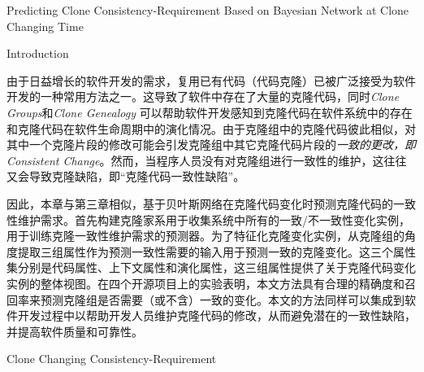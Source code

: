 
{Predicting Clone Consistency-Requirement Based on Bayesian Network at Clone Changing Time}

{Introduction}

由于日益增长的软件开发的需求，复用已有代码（代码克隆）已被广泛接受为软件开发的一种常用方法之一。这导致了软件中存在了大量的克隆代码，同时{\em Clone Groups}和{\em   Clone Genealogy }可以帮助软件开发感知到克隆代码在软件系统中的存在和克隆代码在软件生命周期中的演化情况。由于克隆组中的克隆代码彼此相似，对其中一个克隆片段的修改可能会引发克隆组中其它克隆代码片段的{\em 一致的更改，即Consistent Change}。然而，当程序人员没有对克隆组进行一致性的维护，这往往又会导致克隆缺陷，即“克隆代码一致性缺陷”。%

因此，本章与第三章相似，基于贝叶斯网络在克隆代码变化时预测克隆代码的一致性维护需求。首先构建克隆家系用于收集系统中所有的一致/不一致性变化实例，用于训练克隆一致性维护需求的预测器。为了特征化克隆变化实例，从克隆组的角度提取三组属性作为预测一致性需要的输入用于预测一致的克隆变化。这三个属性集分别是代码属性、上下文属性和演化属性，这三组属性提供了关于克隆代码变化实例的整体视图。在四个开源项目上的实验表明，本文方法具有合理的精确度和召回率来预测克隆组是否需要（或不含）一致的变化。本文的方法同样可以集成到软件开发过程中以帮助开发人员维护克隆代码的修改，从而避免潜在的一致性缺陷，并提高软件质量和可靠性。

{Clone Changing Consistency-Requirement}


